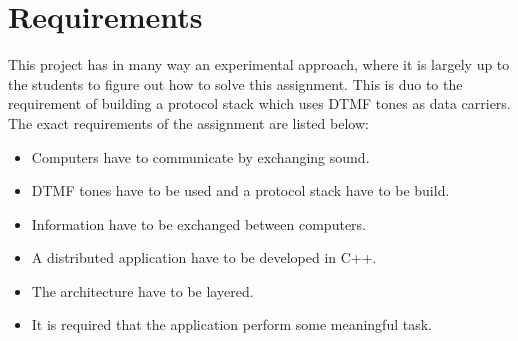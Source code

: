 \section{Requirements}
This project has in many way an experimental approach, where it is largely up to the students to figure out how to solve this assignment. This is duo to the requirement of building a protocol stack which uses DTMF tones as data carriers. The exact requirements of the assignment are listed below:

\begin{itemize}
\item Computers have to communicate by exchanging sound.
\item DTMF tones have to be used and a protocol stack have to be build.
\item Information have to be exchanged between computers.
\item A distributed application have to be developed in C++.
\item The architecture have to be layered.
\item It is required that the application perform some meaningful task.
\end{itemize}